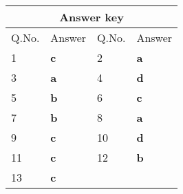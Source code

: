 \setlength\arrayrulewidth{1pt}
\begin{table}[H]
	\centering
	
	\begin{tabular}{|p{1.5cm}|p{1.5cm}||p{1.5cm}|p{1.5cm}|}
		\hline
		\multicolumn{4}{|c|}{\textbf{Answer key}}\\\hline\hline
		\rowcolor{ocrel}Q.No.&Answer&Q.No.&Answer\\\hline
		1&\textbf{c}&2&\textbf{a}\\\hline
		3&\textbf{a}&4&\textbf{d}\\\hline
		5&\textbf{b}&6&\textbf{c}\\\hline
		7&\textbf{b}&8&\textbf{a}\\\hline
		9&\textbf{c}&10&\textbf{d}\\\hline
		11&\textbf{c}&12&\textbf{b}\\\hline
		13&\textbf{c}&&\\\hline
	\end{tabular}
\end{table}